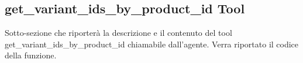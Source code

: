 \subsection{get\_variant\_ids\_by\_product\_id Tool}

Sotto-sezione che riporterà la descrizione e il contenuto del tool get\_variant\_ids\_by\_product\_id chiamabile dall'agente.
Verra riportato il codice della funzione.